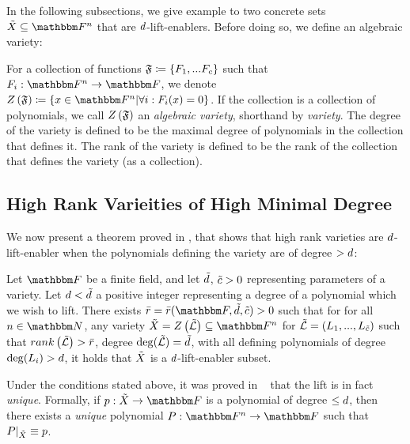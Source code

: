 In the following subsections, we give example to two concrete sets $\variety \subseteq \field$ that are $d$-lift-enablers.
Before doing so, we define an algebraic variety:
\begin{definition}
    For a collection of functions $\genfuncset \definedas \set{\genfunc_1,...\genfunc_c}$ such that $\funcdef{\genfunc_i}{\field}{\basefield}$,
    we denote $\zerofunc{\genfuncset} \definedas \set{x \in \field \suchthat \forall i: \genfunc_i(x) = 0}$.
    \newline
    If the collection is a collection of polynomials, we call $\zerofunc{\genfuncset}$ an \emph{algebraic variety}, shorthand by \emph{variety}.
    \newline
    The degree of the variety is defined to be the maximal degree of polynomials in the collection that defines it.
    The rank of the variety is defined to be the rank of the collection that defines the variety (as a collection).
\end{definition}

\subsection[High Rank Varieties of High Minimal Degree]{High Rank Varieities of High Minimal Degree}\label{subsec:high-rank-varieities-of-high-degree}
We now present a theorem proved in \cite[Corollary 1.10]{kazhdan2018polynomial}, that shows that high rank varieties are $d$-lift-enabler when the polynomials defining the variety are of degree $>d$:
\begin{theorem}\label{subsec:high-rank-varities-are-d-lift-enabler}
    Let $\basefield$ be a finite field, and let $\tilde{d}$, ${\tilde{c}}>0$ representing parameters of a variety.
    Let $d < \tilde{d}$ a positive integer representing a degree of a polynomial which we wish to lift.
    There exists $\varietyrankval=\varietyrankval(\basefield,\varietydeg,\varietypolycount)>0$ such that for for all $\blocklength \in \naturalnumbersset$, any variety $\variety = \zerofunc{\varpolyset} \subseteq \field$ for $\varpolyset = (\varpoly_1,...,\varpoly_{\varietypolycount})$
    such that $\rank{\varpolyset} > \varietyrankval$, degree $\deg(\varpolyset) = \varietydeg$, with all defining polynomials of degree $\deg(\varpoly_i)> \degree$,
    it holds that ${\tilde{X}}$ is a $d$-lift-enabler subset.
\end{theorem}
\begin{remark}
    Under the conditions stated above, it was proved in ~\cite{kazhdan2018polynomial} that the lift is in fact \emph{unique}.
    Formally, if $\funcdef{\onvarpoly}{\variety}{\basefield}$ is a polynomial of degree $\leq d$,
    then there exists a \emph{unique} polynomial $\funcdef{\genpoly }{\field}{\basefield}$ such that $\restrictfunc{\genpoly}{\variety} \equiv \onvarpoly$.
\end{remark}

